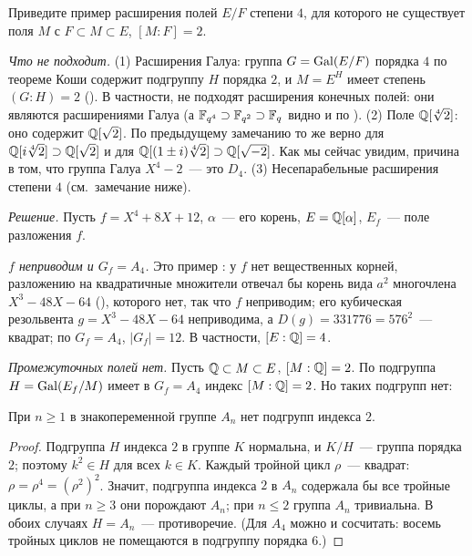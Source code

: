 \begin{exercise}[4-4]
Приведите пример расширения полей $E/F$ степени $4$, для которого не существует поля $M$ с $F\subset M\subset E$,
$[M:F]=2$.
\end{exercise}

\noindent\emph{Что не подходит.} (1) Расширения Галуа: группа $G=\operatorname{Gal}(E/F)$ порядка $4$ по теореме Коши содержит подгруппу
$H$ порядка $2$, и $M=E^H$ имеет степень $(G:H)=2$ (). В частности, не подходят расширения конечных полей: они
являются расширениями Галуа (а $\mathbb F_{q^4}\supset\mathbb F_{q^2}\supset\mathbb F_q$ видно и по ). (2) Поле $\mathbb Q[\sqrt[4]2]$: оно
содержит $\mathbb Q[\sqrt2]$. По предыдущему замечанию то же верно для $\mathbb Q[i\sqrt[4]2]\supset\mathbb Q[\sqrt2]$ и для
$\mathbb Q[(1\pm i)\sqrt[4]2]\supset\mathbb Q[\sqrt{-2}]$. Как мы сейчас увидим, причина в том, что группа Галуа $X^4-2$~--- это $D_4$.
(3) Несепарабельные расширения степени $4$ (см.\ замечание ниже).

\medskip\noindent\emph{Решение.} Пусть $f=X^4+8X+12$, $\alpha$~--- его корень, $E=\mathbb Q[\alpha]$, $E_f$~--- поле разложения $f$.

\emph{$f$ неприводим и $G_f=A_4$.} Это пример : у $f$ нет вещественных корней, разложению на квадратичные множители
отвечал бы корень вида $a^2$ многочлена $X^3-48X-64$ (), которого нет, так что $f$ неприводим; его кубическая
резольвента $g=X^3-48X-64$ неприводима, а $D(g)=331776=576^2$~--- квадрат; по  $G_f=A_4$, $|G_f|=12$. В частности,
$[E:\mathbb Q]=4$.

\emph{Промежуточных полей нет.} Пусть $\mathbb Q\subset M\subset E$, $[M:\mathbb Q]=2$. По  подгруппа $H=\operatorname{Gal}(E_f/M)$ имеет в
$G_f=A_4$ индекс $[M:\mathbb Q]=2$. Но таких подгрупп нет:

\begin{lemma}[4.39m]
При $n\ge1$ в знакопеременной группе $A_n$ нет подгрупп индекса $2$.
\end{lemma}

\begin{proof}
Подгруппа $H$ индекса $2$ в группе $K$ нормальна, и $K/H$~--- группа порядка $2$; поэтому $k^2\in H$ для всех $k\in K$.
Каждый тройной цикл $\rho$~--- квадрат: $\rho=\rho^4=(\rho^2)^2$. Значит, подгруппа индекса $2$ в $A_n$ содержала бы все
тройные циклы, а при $n\ge3$ они порождают $A_n$; при $n\le2$ группа $A_n$ тривиальна. В обоих случаях $H=A_n$~---
противоречие. (Для $A_4$ можно и сосчитать: восемь тройных циклов не помещаются в подгруппу порядка $6$.)
\end{proof}

